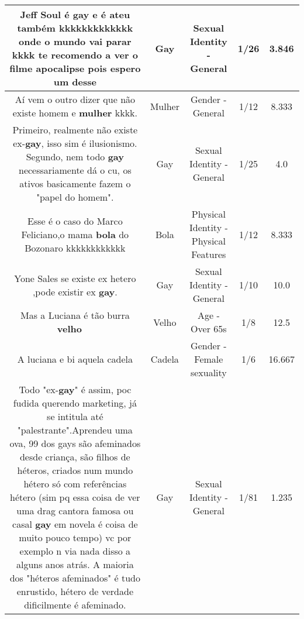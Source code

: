 \documentclass[11pt]{article}
\newlength\mylength
\begin{document}
\begin{center}
\begin{longtable}{|C{.65\mylength}|C{.30\mylength}|C{.12\mylength}|C{.12\mylength}|C{.12\mylength}|}
  \small Jeff Soul é \textbf{gay} e é ateu também kkkkkkkkkkkkk onde o mundo vai parar kkkk te recomendo a ver o filme apocalipse pois espero um desse\normalsize   & Gay & Sexual Identity - General & 1/26 & 3.846 \\  \hline
  \small Aí vem o outro dizer que não existe homem e \textbf{mulher} kkkk.\normalsize   & Mulher & Gender - General & 1/12 & 8.333 \\  \hline
  \small Primeiro, realmente não existe ex-\textbf{gay}, isso sim é ilusionismo. Segundo, nem todo \textbf{gay} necessariamente dá o cu, os ativos basicamente fazem o "papel do homem".\normalsize   & Gay & Sexual Identity - General & 1/25 & 4.0 \\  \hline
  \small Esse é o caso do Marco Feliciano,o mama \textbf{bola} do Bozonaro kkkkkkkkkkkk\normalsize   & Bola & Physical Identity - Physical Features & 1/12 & 8.333 \\  \hline
  \small Yone Sales se existe ex hetero ,pode existir ex \textbf{gay}.\normalsize   & Gay & Sexual Identity - General & 1/10 & 10.0 \\  \hline
  \small Mas a Luciana é tão burra \textbf{velho} 🤦🏽‍♂️\normalsize   & Velho & Age - Over 65s & 1/8 & 12.5 \\  \hline
  \small A luciana e bi aquela cadela\normalsize   & Cadela & Gender - Female sexuality & 1/6 & 16.667 \\  \hline
  \small Todo "ex-\textbf{gay}" é assim, poc fudida querendo marketing, já se intitula até "palestrante".Aprendeu uma ova, 99 dos gays são afeminados desde criança, são filhos de héteros, criados num mundo hétero só com referências hétero (sim pq essa coisa de ver uma drag cantora famosa ou casal \textbf{gay} em novela é coisa de muito pouco tempo) vc por exemplo n via nada disso a alguns anos atrás. A maioria dos "héteros afeminados" é tudo enrustido, hétero de verdade dificilmente é afeminado.\normalsize   & Gay & Sexual Identity - General & 1/81 & 1.235 \\  \hline

\end{longtable}
\end{center}
\end{document}
